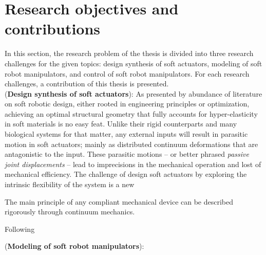 \clearpage
\section{Research objectives and contributions}
In this section, the research problem of the thesis is divided into three research challenges for the given topics: design synthesis of soft actuators, modeling of soft robot manipulators, and control of soft robot manipulators. For each research challenges, a contribution of this thesis is presented. \\

\noindent (\textbf{Design synthesis of soft actuators}): As presented by abundance of literature on soft robotic design, either rooted in engineering principles or optimization, achieving an optimal structural geometry that fully accounts for hyper-elasticity in soft materials is no easy feat. Unlike their rigid counterparts and many biological systems for that matter, any external inputs will result in parasitic motion in soft actuators; mainly as distributed continuum deformations that are antagonistic to the input. These parasitic motions -- or better phrased \textit{passive joint displacements} -- lead to imprecisions in the mechanical operation and lost of mechanical efficiency. The challenge of design soft actuators by exploring the intrinsic flexibility of the system is a new 
\par The main principle of any compliant mechanical device can be described rigorously through continuum mechanics.


Following


\noindent (\textbf{Modeling of soft robot manipulators}):